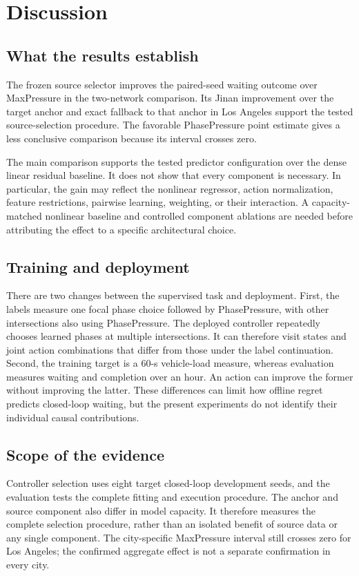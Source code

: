 \section{Discussion}
\subsection{What the results establish}
The frozen source selector improves the paired-seed waiting outcome over MaxPressure in the two-network comparison. Its Jinan improvement over the target anchor and exact fallback to that anchor in Los Angeles support the tested source-selection procedure. The favorable PhasePressure point estimate gives a less conclusive comparison because its interval crosses zero.

The main comparison supports the tested predictor configuration over the dense linear residual baseline. It does not show that every component is necessary. In particular, the gain may reflect the nonlinear regressor, action normalization, feature restrictions, pairwise learning, weighting, or their interaction. A capacity-matched nonlinear baseline and controlled component ablations are needed before attributing the effect to a specific architectural choice.

\subsection{Training and deployment}
There are two changes between the supervised task and deployment. First, the labels measure one focal phase choice followed by PhasePressure, with other intersections also using PhasePressure. The deployed controller repeatedly chooses learned phases at multiple intersections. It can therefore visit states and joint action combinations that differ from those under the label continuation. Second, the training target is a 60-s vehicle-load measure, whereas evaluation measures waiting and completion over an hour. An action can improve the former without improving the latter. These differences can limit how offline regret predicts closed-loop waiting, but the present experiments do not identify their individual causal contributions.

\subsection{Scope of the evidence}
Controller selection uses eight target closed-loop development seeds, and the evaluation tests the complete fitting and execution procedure. The anchor and source component also differ in model capacity. It therefore measures the complete selection procedure, rather than an isolated benefit of source data or any single component. The city-specific MaxPressure interval still crosses zero for Los Angeles; the confirmed aggregate effect is not a separate confirmation in every city.


